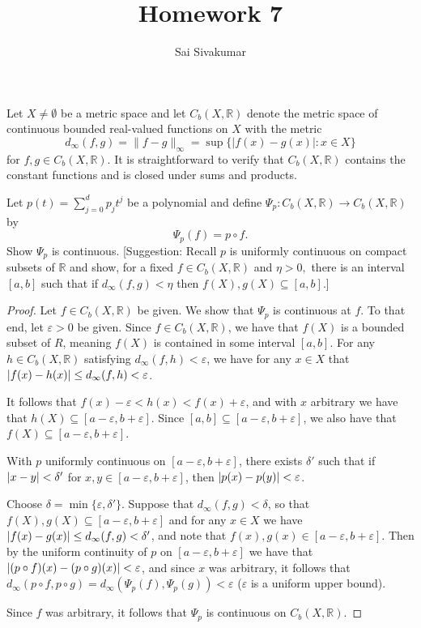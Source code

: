 \documentclass[12pt]{amsart}
\title{Homework 7}
\author{Sai Sivakumar}
\newcommand{\RR}{\mathbb{R}}
\begin{document}
\maketitle

Let $X\ne \emptyset$ be a metric space and let $C_b(X,\RR)$ denote the
 metric space of continuous bounded real-valued functions
 on $X$ with the metric
\[
 d_\infty(f,g)=\|f-g\|_\infty = \sup\{|f(x)-g(x)|:x\in X\}
\]
for $f,g\in C_b(X,\RR).$  It is straightforward to verify
 that $C_b(X,\RR)$ contains the constant functions and
 is closed under sums and products. 

Let $p(t)=\sum_{j=0}^d p_jt^j$ be a polynomial
 and define $\Psi_p:C_b(X,\RR)\to C_b(X,\RR)$ by 
\[
 \Psi_p(f)=p\circ f.
\]
 Show $\Psi_p$ is continuous. [Suggestion: Recall
 $p$ is uniformly continuous on compact subsets
 of $\RR$ and show, for a fixed $f\in C_b(X,\RR)$
 and $\eta>0,$ there is an interval $[a,b]$ such that
 if $d_\infty(f,g)<\eta$ then $f(X),g(X)\subseteq [a,b].$]


\bigskip

\begin{proof}
Let $f\in C_b(X,\mathbb{R})$ be given. We show that $\Psi_p$ is continuous at $f$. To that end, let $\varepsilon > 0$ be given. Since $f\in C_b(X,\mathbb{R})$, we have that $f(X)$ is a bounded subset of $R$, meaning $f(X)$ is contained in some interval $[a,b]$. For any $h\in C_b(X,\mathbb{R})$ satisfying $d_\infty(f,h)<\varepsilon$, we have for any $x\in X$ that $\abs{f(x)-h(x)}\leq d_\infty(f,h) < \varepsilon$.

It follows that $f(x)-\varepsilon < h(x) < f(x) + \varepsilon$, and with $x$ arbitrary we have that $h(X)\subseteq [a-\varepsilon, b+\varepsilon]$. Since $[a,b]\subseteq [a-\varepsilon, b+\varepsilon]$, we also have that $f(X)\subseteq [a-\varepsilon, b+\varepsilon]$. 

With $p$ uniformly continuous on $[a-\varepsilon, b+\varepsilon]$, there exists $\delta '$ such that if $\abs{x-y}<\delta '$ for $x,y\in [a-\varepsilon, b+\varepsilon]$, then $\abs{p(x)-p(y)}<\varepsilon$.

Choose $\delta = \min\{\varepsilon, \delta '\}$. Suppose that $d_\infty(f,g)<\delta$, so that $f(X),g(X)\subseteq [a-\varepsilon, b+\varepsilon]$ and for any $x\in X$ we have $\abs{f(x)-g(x)}\leq d_\infty(f,g)< \delta '$, and note that $f(x),g(x)\in [a-\varepsilon, b+\varepsilon]$. Then by the uniform continuity of $p$ on $[a-\varepsilon, b+\varepsilon]$ we have that $\abs{(p\circ f)(x) -  (p\circ g)(x)}< \varepsilon$, and since $x$ was arbitrary, it follows that $d_\infty(p\circ f, p\circ g) = d_\infty(\Psi_p(f), \Psi_p(g))< \varepsilon$ ($\varepsilon$ is a uniform upper bound). 

Since $f$ was arbitrary, it follows that $\Psi_p$ is continuous on $C_b(X,\mathbb{R})$.
\end{proof}
\end{document}
